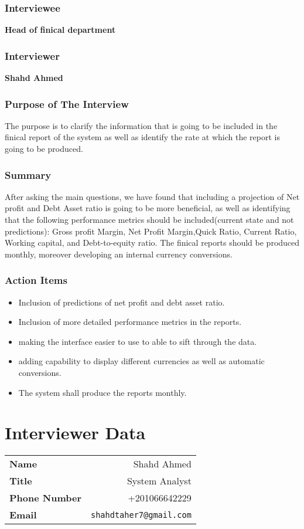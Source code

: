 \documentclass{article}
\begin{document}
\subsubsection{Interviewee}
\textbf{Head of finical department}
\subsubsection{Interviewer}
\textbf{Shahd Ahmed}
\subsubsection{Purpose of The Interview}
The purpose is to clarify the information that is going to be included in the finical report of the system as well as identify the rate at which the report is going to be produced.
\subsubsection{Summary}
After asking the main questions, we have found that including a projection of Net profit and Debt Asset ratio is going to be more beneficial, as well as identifying that the following performance metrics should be included(current state and not predictions): Gross profit Margin, Net Profit Margin,Quick Ratio, Current Ratio, Working capital, and Debt-to-equity ratio. The finical reports should be produced monthly, moreover developing an internal currency conversions.
\subsubsection{Action Items}
\begin{itemize}
    \item Inclusion of predictions of net profit and debt asset ratio.
    \item Inclusion of more detailed performance metrics in the reports.
    \item making the interface easier to use to able to sift through the data.
    \item adding capability to display different currencies as well as automatic conversions.
    \item The system shall produce the reports monthly.
\end{itemize}
\section{Interviewer Data}
\begin{table}[h]
    \centering
    \begin{tabular}{l r}
        \toprule
        \textbf{Name}         & Shahd Ahmed                    \\
        \textbf{Title}        & System Analyst                 \\
        \textbf{Phone Number} & +201066642229                  \\
        \textbf{Email}        & \texttt{shahdtaher7@gmail.com} \\
        \bottomrule
    \end{tabular}
\end{table}
\end{document}
